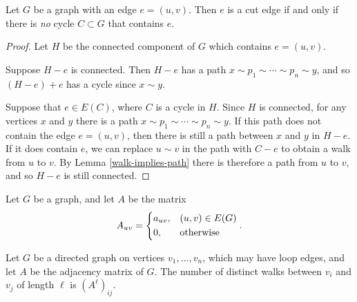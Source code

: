 \begin{thm}
    Let $G$ be a graph with an edge $e = (u, v)$. Then $e$ is a cut edge if and only if there is \emph{no} cycle $C \subset G$ that contains $e$.
\end{thm}

\begin{proof}
    Let $H$ be the connected component of $G$ which contains $e = (u, v)$.

    Suppose $H - e$ is connected. Then $H - e$ has a path $x \sim p_1 \sim \cdots \sim p_n \sim y$, and so $(H - e) + e$ has a cycle since $x \sim y$.

    Suppose that $e \in E(C)$, where $C$ is a cycle in $H$. Since $H$ is connected, for any vertices $x$ and $y$ there is a path $x \sim p_1 \sim \cdots \sim p_n \sim y$. If this path does not contain the edge $e = (u, v)$, then there is still a path between $x$ and $y$ in $H - e$. If it does contain $e$, we can replace $u \sim v$ in the path with $C - e$ to obtain a walk from $u$ to $v$. By Lemma \ref{walk-implies-path} there is therefore a path from $u$ to $v$, and so $H - e$ is still connected.
\end{proof}

\begin{defn}
    Let $G$ be a graph, and let $A$ be the matrix
    \begin{align*}
        A_{uv} = \begin{dcases}
            a_{uv}, &(u, v) \in E(G) \\
            0, &\textrm{otherwise}
        \end{dcases}.
    \end{align*}
\end{defn}

\begin{thm}
    Let $G$ be a directed graph on vertices $v_1, \ldots, v_n$, which may have loop edges, and let $A$ be the adjacency matrix of $G$. The number of distinct walks between $v_i$ and $v_j$ of length $\ell$ is $(A^{\ell})_{ij}$.
\end{thm}

